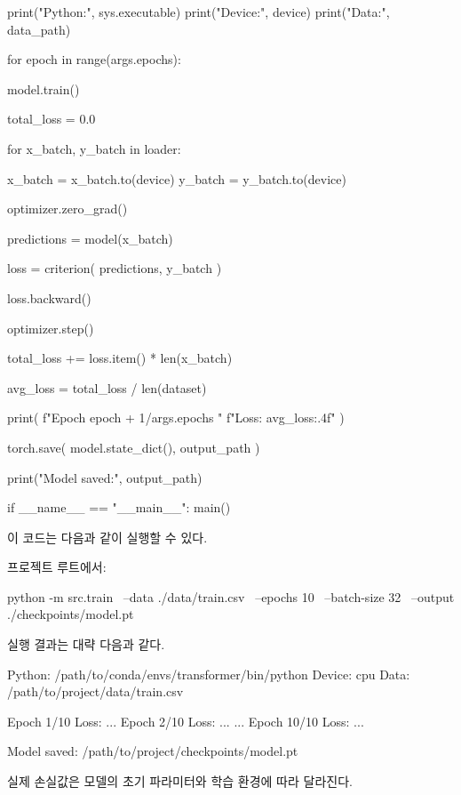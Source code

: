 \begin{dhkcode}
    print("Python:", sys.executable)
    print("Device:", device)
    print("Data:", data_path)

    for epoch in range(args.epochs):

        model.train()

        total_loss = 0.0

        for x_batch, y_batch in loader:

            x_batch = x_batch.to(device)
            y_batch = y_batch.to(device)

            optimizer.zero_grad()

            predictions = model(x_batch)

            loss = criterion(
                predictions,
                y_batch
            )

            loss.backward()

            optimizer.step()

            total_loss += loss.item() * len(x_batch)

        avg_loss = total_loss / len(dataset)

        print(
            f"Epoch {epoch + 1}/{args.epochs} "
            f"Loss: {avg_loss:.4f}"
        )

    torch.save(
        model.state_dict(),
        output_path
    )

    print("Model saved:", output_path)


if __name__ == "__main__":
    main()
\end{dhkcode}

이 코드는 다음과 같이 실행할 수 있다.

프로젝트 루트에서:

\begin{dhkzsh}
python -m src.train \
    --data ./data/train.csv \
    --epochs 10 \
    --batch-size 32 \
    --output ./checkpoints/model.pt
\end{dhkzsh}

실행 결과는 대략 다음과 같다.

\begin{dhkzsh}
Python: /path/to/conda/envs/transformer/bin/python
Device: cpu
Data: /path/to/project/data/train.csv

Epoch 1/10 Loss: ...
Epoch 2/10 Loss: ...
...
Epoch 10/10 Loss: ...

Model saved: /path/to/project/checkpoints/model.pt
\end{dhkzsh}

실제 손실값은 모델의 초기 파라미터와 학습 환경에 따라 달라진다.

